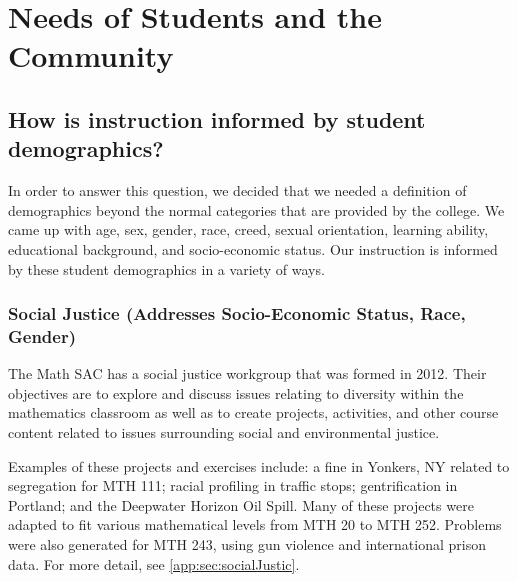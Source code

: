 \chapter{Needs of Students and the Community}
\section{How is instruction informed by student demographics?}
In order to answer this question, we decided that we needed a definition of demographics beyond the normal categories that are provided by the college. We came up with age, sex, gender, race, creed, sexual orientation, learning ability, educational background, and socio-economic status. Our instruction is informed by these student demographics in a variety of ways.
\label{needs:sec:definitiondiversity}



\subsection{Social Justice (Addresses Socio-Economic Status, Race, Gender)}
The Math SAC has a social justice workgroup that was formed in 2012.  Their objectives are to explore and discuss issues relating to diversity within the mathematics classroom as well as to create projects, activities, and other course content related to issues surrounding social and environmental justice.

Examples of these projects and exercises include: a fine in Yonkers, NY related to segregation
for MTH 111; racial profiling in traffic stops; gentrification in Portland; and the Deepwater Horizon Oil Spill. Many of these projects were adapted to fit various mathematical levels from MTH 20 to MTH 252. Problems were also generated for MTH 243, using gun violence and international prison data. For more detail, see \vref{app:sec:socialJustic}.

